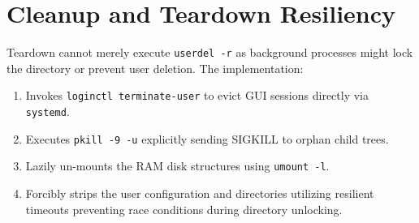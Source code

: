\section{Cleanup and Teardown Resiliency}

Teardown cannot merely execute \texttt{userdel -r} as background processes might lock the directory or prevent user deletion. The implementation:
\begin{enumerate}
    \item Invokes \texttt{loginctl terminate-user} to evict GUI sessions directly via \texttt{systemd}.
    \item Executes \texttt{pkill -9 -u} explicitly sending SIGKILL to orphan child trees.
    \item Lazily un-mounts the RAM disk structures using \texttt{umount -l}.
    \item Forcibly strips the user configuration and directories utilizing resilient timeouts preventing race conditions during directory unlocking.
\end{enumerate}
